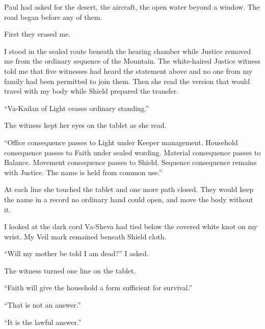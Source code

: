 
\ornament

Paul had asked for the desert, the aircraft, the open water beyond a window. The road began before any of them.\par

First they erased me.\par

\ornament

I stood in the sealed route beneath the hearing chamber while Justice removed me from the ordinary sequence of the Mountain. The white-haired Justice witness told me that five witnesses had heard the statement above and no one from my family had been permitted to join them. Then she read the version that would travel with my body while Shield prepared the transfer.\par

``Va-Kailan of Light ceases ordinary standing.''\par

The witness kept her eyes on the tablet as she read.\par

``Office consequence passes to Light under Keeper management. Household consequence passes to Faith under sealed wording. Material consequence passes to Balance. Movement consequence passes to Shield. Sequence consequence remains with Justice. The name is held from common use.''\par

At each line she touched the tablet and one more path closed. They would keep the name in a record no ordinary hand could open, and move the body without it.\par

I looked at the dark cord Va-Sheva had tied below the covered white knot on my wrist. My Veil mark remained beneath Shield cloth.\par

``Will my mother be told I am dead?'' I asked.\par

The witness turned one line on the tablet.\par

``Faith will give the household a form sufficient for survival.''\par

``That is not an answer.''\par

``It is the lawful answer.''\par

